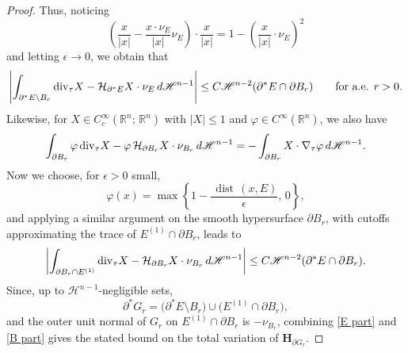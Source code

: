 \documentclass[reqno,11pt]{amsart}
\def\dist{{\mathop\mathrm{\,dist\,}}}
\def\ez{\epsilon}
\numberwithin{equation}{section}
\theoremstyle{remark}
\begin{document}
\begin{proof}
Thus, noticing 
$$\left(\frac x {|x|} -\frac{x\cdot \nu_E}{|x|} \nu_E\right)\cdot \frac x {|x|}=1-\left(\frac{x}{|x|}\cdot \nu_E\right)^2$$
and letting $\ez\to 0$, we obtain that
\begin{equation}\label{E part}
\left|\int_{\partial^* E\setminus B_{r}}   {\rm div}_\tau X -  \mathcal H_{\partial^* E}  X\cdot \nu_E    \, d\mathscr H^{n-1}\right|\le C  \mathscr H^{n-2}(\partial^*E\cap \partial B_{r}) \qquad \text{for a.e. } r>0. 
\end{equation}
Likewise, for $X\in C_c^\infty(\mathbb R^n;\, \mathbb R^n)$ with $|X|\le 1$ and $\varphi\in C^\infty(\mathbb R^n)$, we also have
$$\int_{\partial  B_r} \varphi \,{\rm div}_\tau X - \varphi  \,\mathcal H_{\partial B_r}  X\cdot \nu_{B_r}  \, d\mathscr H^{n-1}=- \int_{\partial  B_r} X \cdot \nabla_\tau \varphi  \, d\mathscr H^{n-1}.$$
Now we choose, for $\ez>0$ small,
$$\varphi(x)=\max\left\{1-\frac{\dist(x,E)}{\ez},\,0\right\},$$
and applying a similar argument on the smooth hypersurface $\partial B_r$, with
cutoffs approximating the trace of $E^{(1)}\cap\partial B_r$,  leads to
\begin{equation}\label{B part}
\left|\int_{\partial B_{r}\cap E^{(1)}}   {\rm div}_\tau X -  \mathcal H_{\partial  B_r}  X\cdot \nu_{B_r}    \, d\mathscr H^{n-1}\right|\le C  \mathscr H^{n-2}(\partial^*E\cap \partial B_{r}). 
\end{equation}
Since, up to $\mathscr H^{n-1}$-negligible sets,
$$
\partial^*G_r=\big(\partial^*E\setminus B_r\big)\cup \big(E^{(1)}\cap \partial B_r\big),
$$
and the outer unit normal of $G_r$ on $E^{(1)}\cap \partial B_r$ is $-\nu_{B_r}$, combining \eqref{E part} and \eqref{B part} gives the stated bound on the total variation of $\mathbf H_{\partial G_r}$.
\end{proof}
 
% 
\end{document}
